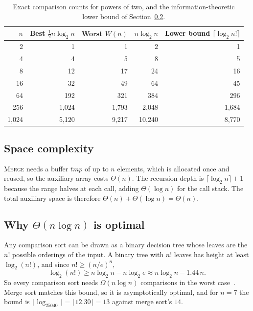 \documentclass[11pt,a4paper]{article}
\theoremstyle{plain}
\theoremstyle{definition}
\renewcommand{\lg}{\log_2}
\begin{document}
\begin{table}[!ht]
\centering\small
\begin{tabular}{@{}rrrrr@{}}
\toprule
$n$ & Best $\tfrac12 n\lg n$ & Worst $W(n)$ & $n\lg n$ & Lower bound $\lceil\lg n!\rceil$\\
\midrule
2 & 1 & 1 & 2 & 1\\
4 & 4 & 5 & 8 & 5\\
8 & 12 & 17 & 24 & 16\\
16 & 32 & 49 & 64 & 45\\
64 & 192 & 321 & 384 & 296\\
256 & 1,024 & 1,793 & 2,048 & 1,684\\
1,024 & 5,120 & 9,217 & 10,240 & 8,770\\
\bottomrule
\end{tabular}
\caption{Exact comparison counts for powers of two, and the information-theoretic lower bound of Section~\ref{sec:lower}.}
\label{tab:Wvals}
\end{table}

\subsection{Space complexity}
\textsc{Merge} needs a buffer $tmp$ of up to $n$ elements, which is allocated once and reused, so the auxiliary array costs $\Theta(n)$. The recursion depth is $\lceil\lg n\rceil+1$ because the range halves at each call, adding $\Theta(\log n)$ for the call stack. The total auxiliary space is therefore $\Theta(n)+\Theta(\log n)=\Theta(n)$.

\subsection{Why $\Theta(n\log n)$ is optimal}\label{sec:lower}
Any comparison sort can be drawn as a binary decision tree whose leaves are the $n!$ possible orderings of the input. A binary tree with $n!$ leaves has height at least $\lg(n!)$, and since $n!\ge(n/e)^n$,
\[
  \lg(n!)\ge n\lg n-n\lg e\approx n\lg n-1.44\,n.
\]
So every comparison sort needs $\Omega(n\log n)$ comparisons in the worst case~\cite{clrs}. Merge sort matches this bound, so it is asymptotically optimal, and for $n=7$ the bound is $\lceil\lg 5040\rceil=\lceil12.30\rceil=13$ against merge sort's $14$.
\end{document}
